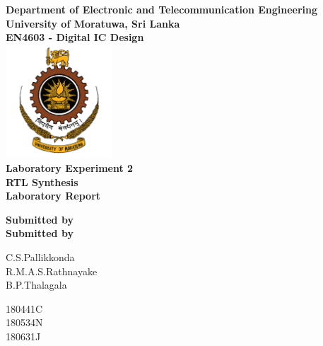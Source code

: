 \begin{titlepage}
\center %

\textbf{\large Department of Electronic and Telecommunication Engineering}\\[0.5cm]
\textbf{\Large University of Moratuwa, Sri Lanka}\\[1cm]
\textbf{\large EN4603 - Digital IC Design}\\[2cm]
\includegraphics[width=0.3\textwidth]{figures/uomlogo}\\[2cm]

	
\textbf{\Huge Laboratory Experiment 2 \\RTL Synthesis }\\[0.2cm]
\textbf{\Large Laboratory Report}\\[3cm]




\vfill

\textbf{\large Submitted by}\\[0.5cm]

\textbf{\large Submitted by}\\[2mm]
\begin{minipage}{0.3\textwidth}
	\begin{flushleft}
		{\large C.S.Pallikkonda}\\[2mm]
		{\large R.M.A.S.Rathnayake }\\[2mm]
		{\large B.P.Thalagala }\\[2mm]		
		
	\end{flushleft}
\end{minipage}
\hspace{2mm}
\begin{minipage}{0.2\textwidth}
	\begin{flushright}
		{\large 180441C }\\[2mm]
		{\large 180534N }\\[2mm]
		{\large 180631J }\\[2mm]


\end{flushright}
\end{minipage}
\end{titlepage}
